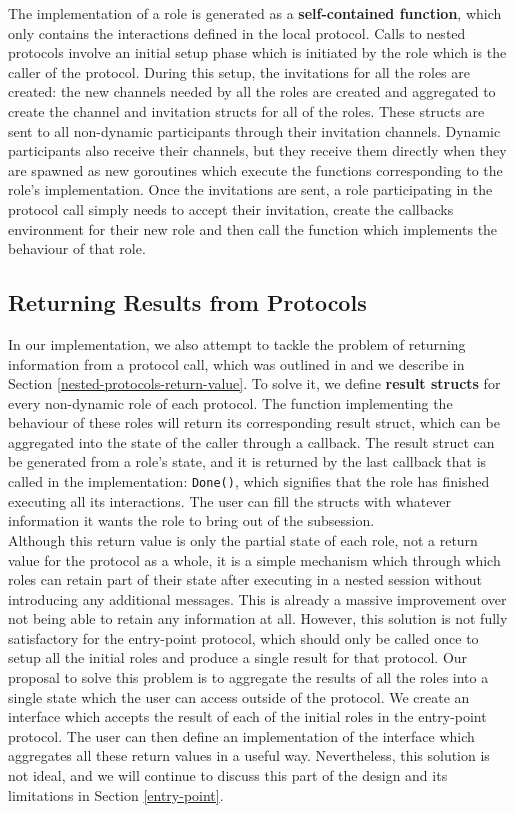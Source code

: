 \documentclass[12pt,twoside]{report}
\begin{document}
The implementation of a role is generated as a \textbf{self-contained function}, which only contains the interactions defined in the local protocol. Calls to nested protocols involve an initial setup phase which is initiated by the role which is the caller of the protocol. During this setup, the invitations for all the roles are created: the new channels needed by all the roles are created and aggregated to create the channel and invitation structs for all of the roles. These structs are sent to all non-dynamic participants through their invitation channels. Dynamic participants also receive their channels, but they receive them directly when they are spawned as new goroutines which execute the functions corresponding to the role's implementation. Once the invitations are sent, a role participating in the protocol call simply needs to accept their invitation, create the callbacks environment for their new role and then call the function which implements the behaviour of that role.

\subsection{Returning Results from Protocols}

In our implementation, we also attempt to tackle the problem of returning information from a protocol call, which was outlined in \cite{nestedprotocols} and we describe in Section \ref{nested-protocols-return-value}. To solve it, we define \textbf{result structs} for every non-dynamic role of each protocol. The function implementing the behaviour of these roles will return its corresponding result struct, which can be aggregated into the state of the caller through a callback. The result struct can be generated from a role's state, and it is returned by the last callback that is called in the implementation: \texttt{Done()}, which signifies that the role has finished executing all its interactions. The user can fill the structs with whatever information it wants the role to bring out of the subsession.\\

Although this return value is only the partial state of each role, not a return value for the protocol as a whole, it is a simple mechanism which through which roles can retain part of their state after executing in a nested session without introducing any additional messages. This is already a massive improvement over not being able to retain any information at all. However, this solution is not fully satisfactory for the entry-point protocol, which should only be called once to setup all the initial roles and produce a single result for that protocol. Our proposal to solve this problem is to aggregate the results of all the roles into a single state which the user can access outside of the protocol. We create an interface which accepts the result of each of the initial roles in the entry-point protocol. The user can then define an implementation of the interface which aggregates all these return values in a useful way. Nevertheless, this solution is not ideal, and we will continue to discuss this part of the design and its limitations in Section \ref{entry-point}.
\end{document}
